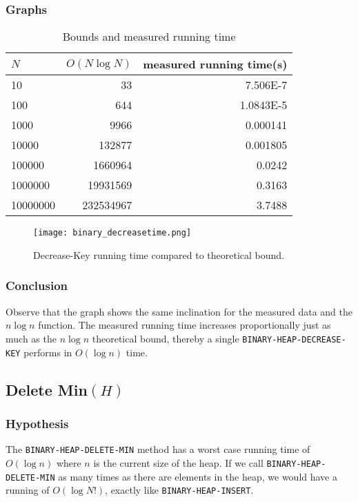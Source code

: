 \documentclass[a4paper,oneside,11pt]{article}
\begin{document}
\begin{itemize}
\subsubsection*{Graphs}
\begin{table}
  \begin{center}
    \begin{tabular}{l|r|r}
      $N$ & $O(N\log N)$ & measured running time(s)\\
      \hline
      10       & 33         & \num{7.506E-7}\\
      100      & 644        & \num{1.0843E-5}\\
      1000     & 9966       & \num{0.000141}\\
      10000    & 132877     & \num{0.001805}\\
      100000   & 1660964    & \num{0.0242}\\
      1000000  & 19931569   & \num{0.3163}\\
      10000000 & 232534967  & \num{3.7488}
    \end{tabular}
    \caption{Bounds and measured running time}
  \end{center}
\end{table}
\begin{figure}
    \texttt{[image: binary\_decreasetime.png]}
    \caption{Decrease-Key running time compared to theoretical bound.}
\end{figure}

\subsubsection*{Conclusion}
Observe that the graph shows the same inclination for the measured data and the $n\log n$ function. The measured running time increases proportionally just as much as the $n\log n$ theoretical bound, thereby a single \texttt{BINARY-HEAP-DECREASE-KEY} performs in $O(\log n)$ time.

\subsection*{Delete Min$(H)$}
\subsubsection*{Hypothesis}
The \texttt{BINARY-HEAP-DELETE-MIN} method has a worst case running time of $O(\log n)$ where $n$ is the current size of the heap. If we call \texttt{BINARY-HEAP-DELETE-MIN} as many times as there are elements in the heap, we would have a running of $O(\log N!)$, exactly like \texttt{BINARY-HEAP-INSERT}.


\end{itemize}
\end{document}
